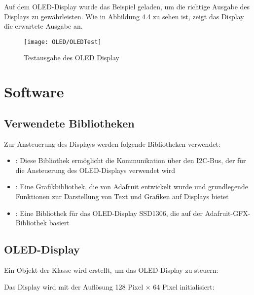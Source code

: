 Auf dem OLED-Display wurde das Beispiel  geladen, um die richtige Ausgabe des Displays zu gewährleisten. Wie in Abbildung 4.4 zu sehen ist, zeigt das Display die erwartete Ausgabe an.

\begin{figure}
    \centering
    \texttt{[image: OLED/OLEDTest]}
    \caption{Testausgabe des OLED Display}
\end{figure}

\section{Software}

\subsection{Verwendete Bibliotheken}

Zur Ansteuerung des Displays werden folgende Bibliotheken verwendet:

\begin{itemize}
    \item {}: Diese Bibliothek ermöglicht die Kommunikation über den I2C-Bus, der für die Ansteuerung des OLED-Displays verwendet wird \cite{ArduinoWire:2022}
    \item {}: Eine Grafikbibliothek, die von Adafruit entwickelt wurde und grundlegende Funktionen zur Darstellung von Text und Grafiken auf Displays bietet \cite{AdafruitGFX:2023} 
    \item {}: Eine Bibliothek für das  OLED-Display SSD1306, die auf der Adafruit-GFX-Bibliothek basiert\cite{ArduinoSSD:2023} 
\end{itemize}

\subsection{OLED-Display}

Ein Objekt der Klasse  wird erstellt, um das OLED-Display zu steuern:

\medskip


\medskip

Das Display wird mit der Auflösung 128 Pixel $\times$ 64 Pixel initialisiert:

